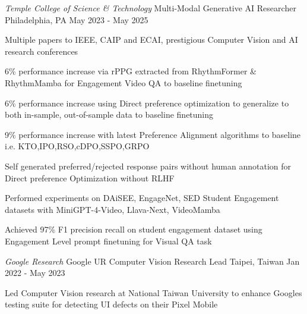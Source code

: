 

\begin{cventries}
  \cventry
    {\emph{Temple College of Science \& Technology}} %
    {Multi-Modal Generative AI Researcher} %
    {Philadelphia, PA} %
    {May 2023 - May 2025} %
    {
      \begin{cvitems} %
        \item{Multiple papers to IEEE, CAIP and ECAI, prestigious Computer Vision and AI research conferences}
        \item {6\% performance increase via rPPG extracted from RhythmFormer \& RhythmMamba for Engagement Video QA to baseline finetuning}
        \item {6\% performance increase using Direct preference optimization to generalize to both in-sample, out-of-sample data to baseline finetuning}
        \item {9\% performance increase with latest Preference Alignment algorithms to baseline i.e. KTO,IPO,RSO,cDPO,SSPO,GRPO}
        \item {Self generated preferred/rejected response pairs without human annotation for Direct preference Optimization without RLHF}
        \item {Performed experiments on DAiSEE, EngageNet, SED Student Engagement datasets with MiniGPT-4-Video, Llava-Next, VideoMamba}
        \item {Achieved 97\% F1 precision recall on student engagement dataset using Engagement Level prompt finetuning for Visual QA task}
      \end{cvitems}
    }
  \cventry
    {\emph{Google Research}} %
    {Google UR Computer Vision Research Lead} %
    {Taipei, Taiwan} %
    {Jan 2022 - May 2023} %
    {
      \begin{cvitems} %
        \item {Led Computer Vision research at National Taiwan University to enhance Googles testing suite for detecting UI defects on their Pixel Mobile}

\end{cvitems}}
\end{cventries}
